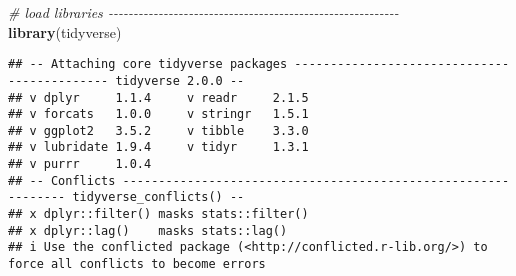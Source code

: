 \documentclass[
]{book}
\newenvironment{Shaded}{\begin{snugshade}}{\end{snugshade}}
\newcommand{\CommentTok}[1]{\textcolor[rgb]{0.56,0.35,0.01}{\textit{#1}}}
\newcommand{\FunctionTok}[1]{\textcolor[rgb]{0.13,0.29,0.53}{\textbf{#1}}}
\newcommand{\NormalTok}[1]{#1}
\begin{document}
\begin{Shaded}
\begin{Highlighting}[]
\CommentTok{\# load libraries {-}{-}{-}{-}{-}{-}{-}{-}{-}{-}{-}{-}{-}{-}{-}{-}{-}{-}{-}{-}{-}{-}{-}{-}{-}{-}{-}{-}{-}{-}{-}{-}{-}{-}{-}{-}{-}{-}{-}{-}{-}{-}{-}{-}{-}{-}{-}{-}{-}{-}{-}{-}{-}{-}{-}{-}{-}{-}}
\FunctionTok{library}\NormalTok{(tidyverse)}
\end{Highlighting}
\end{Shaded}

\begin{verbatim}
## -- Attaching core tidyverse packages -------------------------------------------- tidyverse 2.0.0 --
## v dplyr     1.1.4     v readr     2.1.5
## v forcats   1.0.0     v stringr   1.5.1
## v ggplot2   3.5.2     v tibble    3.3.0
## v lubridate 1.9.4     v tidyr     1.3.1
## v purrr     1.0.4     
## -- Conflicts -------------------------------------------------------------- tidyverse_conflicts() --
## x dplyr::filter() masks stats::filter()
## x dplyr::lag()    masks stats::lag()
## i Use the conflicted package (<http://conflicted.r-lib.org/>) to force all conflicts to become errors
\end{verbatim}
\end{document}
